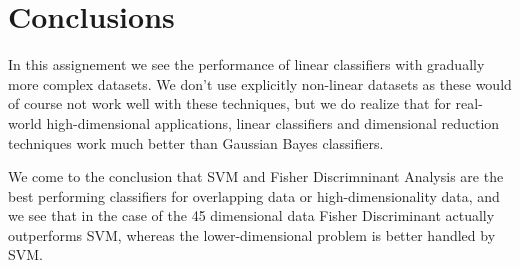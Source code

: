 \documentclass[a4paper]{article}
\begin{document}
\section{Conclusions}

In this assignement we see the performance of linear classifiers with gradually more complex datasets.  We don't use explicitly non-linear datasets as these would of course not work well with these techniques, but we do realize that for real-world high-dimensional applications, linear classifiers and dimensional reduction techniques work much better than Gaussian Bayes classifiers.  

We come to the conclusion that SVM and Fisher Discrimninant Analysis are the best performing classifiers for overlapping
data or high-dimensionality data, and we see that in the case of the 45 dimensional data Fisher Discriminant actually outperforms SVM, whereas the lower-dimensional problem is better handled by SVM.
\end{document}
